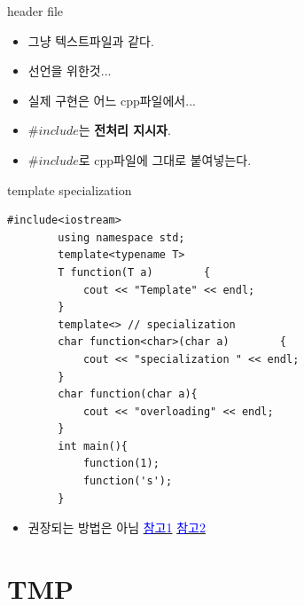 \documentclass[10pt]{beamer}
\begin{document}
\begin{frame}{header file}
    \begin{itemize}
        \item 그냥 텍스트파일과 같다.
        \item 선언을 위한것...
        \item 실제 구현은 어느 cpp파일에서...
        \item $\#include$는 \textbf{전처리 지시자}.
        \item $\#include$로 cpp파일에 그대로 붙여넣는다.
    \end{itemize}
\end{frame}






\begin{frame}[fragile]{template specialization}
    \begin{lstlisting}[style = CppStyle]
        #include<iostream>
        using namespace std;
        template<typename T>
        T function(T a)        {
            cout << "Template" << endl;
        }
        template<> // specialization
        char function<char>(char a)        {
            cout << "specialization " << endl;
        }
        char function(char a){
            cout << "overloading" << endl;
        }
        int main(){
            function(1);
            function('s');
        }
    \end{lstlisting}

    \begin{itemize}
        \item 권장되는 방법은 아님 \href{https://wikidocs.net/652}{\textcolor{blue}{참고1}} \href{https://www.codentalks.com/t/topic/2834}{\textcolor{blue}{참고2}}
    \end{itemize}
\end{frame}    





\section{TMP}
\end{document}
